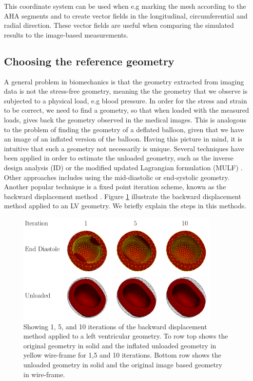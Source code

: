 This coordinate system can be used when e.g marking the mesh according
to the AHA segments and to create vector fields in the longitudinal,
circumferential and radial direction. These vector fields are useful
when comparing the simulated results to the image-based measurements.

\subsection{Choosing the reference geometry}
\label{sef:reference_geometry}
A general problem in biomechanics is that the geometry extracted from
imaging data is not the stress-free geometry, meaning the the geometry
that we observe is subjected to a physical load, e.g blood
pressure. In order for the stress and strain to be correct, we need to
find a geometry, so that when loaded with the measured loads, gives
back the geometry observed in the medical images. 
This is analogous to the problem of finding the geometry of a deflated balloon, given
that we have an image of an inflated version of the balloon. Having
this picture in mind, it is intuitive that such a geometry not necessarily is unique.
Several techniques have been applied in order to estimate the unloaded
geometry, such as the inverse design analysis (ID)
\cite{govindjee1996computational} or the modified updated Lagrangian
formulation (MULF) \cite{gee2010computational}. Other approaches
includes using the mid-diastolic or end-systolic geometry. Another popular
technique is a fixed point iteration scheme,  known as the
backward displacement method \cite{bols2013computational}. Figure
\ref{fig:unloading_lv} illustrate the backward displacement method applied
to an LV geometry. We briefly explain the steps in this methods.

\begin{figure}[htbp]
  \centering
    \includegraphics[width=0.9\textwidth]{chapters/introduction/figures/unloading/canvas.pdf}
\caption{Showing 1, 5, and 10 iterations of the backward displacement
  method applied to a left ventricular geometry. To row top shows the
  original geometry in solid and the inflated unloaded geometry in
  yellow wire-frame for 1,5 and 10 iterations. Bottom row shows the
  unloaded geometry in solid and the original image based geometry in wire-frame.}
\label{fig:unloading_lv}
\end{figure}


